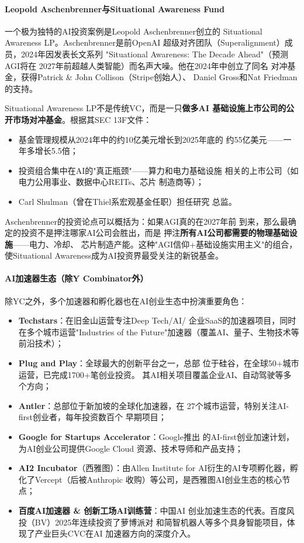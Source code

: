 \paragraph{Leopold Aschenbrenner与Situational Awareness Fund}

一个极为独特的AI投资案例是Leopold Aschenbrenner创立的
Situational Awareness LP。Aschenbrenner是前OpenAI
超级对齐团队（Superalignment）成员，2024年因发表长文系列
"Situational Awareness: The Decade Ahead"（预测AGI将在
2027年前超越人类智能）而名声大噪。他在2024年中创立了同名
对冲基金，获得Patrick \& John Collison（Stripe创始人）、
Daniel Gross和Nat Friedman的支持。

Situational Awareness LP不是传统VC，而是一只\textbf{做多AI
基础设施上市公司的公开市场对冲基金}。根据其SEC 13F文件：
\begin{itemize}
  \item 基金管理规模从2024年中的约10亿美元增长到2025年底的
    约55亿美元——一年多增长5.5倍；
  \item 投资组合集中在AI的"真正瓶颈"——算力和电力基础设施
    相关的上市公司（如电力公用事业、数据中心REITs、芯片
    制造商等）；
  \item Carl Shulman（曾在Thiel系宏观基金任职）担任研究
    总监。
\end{itemize}

Aschenbrenner的投资论点可以概括为：如果AGI真的在2027年前
到来，那么最确定的投资不是押注哪家AI公司会胜出，而是
押注\textbf{所有AI公司都需要的物理基础设施}——电力、冷却、
芯片制造产能。这种"AGI信仰+基础设施实用主义"的组合，
使Situational Awareness成为AI投资界最受关注的新锐基金。

\paragraph{AI加速器生态（除Y Combinator外）}

除YC之外，多个加速器和孵化器也在AI创业生态中扮演重要角色：
\begin{itemize}
  \item \textbf{Techstars}：在旧金山运营专注Deep Tech/AI/
    企业SaaS的加速器项目，同时在多个城市运营"Industries of
    the Future"加速器（覆盖AI、量子、生物技术等前沿技术）；
  \item \textbf{Plug and Play}：全球最大的创新平台之一，总部
    位于硅谷，在全球50+城市运营，已完成1700+笔创业投资。
    其AI相关项目覆盖企业AI、自动驾驶等多个方向；
  \item \textbf{Antler}：总部位于新加坡的全球化加速器，在
    27个城市运营，特别关注AI-first创业者，每年投资数百个
    早期项目；
  \item \textbf{Google for Startups Accelerator}：Google推出
    的AI-first创业加速计划，为AI创业公司提供Google Cloud
    资源、技术导师和产品支持；
  \item \textbf{AI2 Incubator}（西雅图）：由Allen Institute
    for AI衍生的AI专项孵化器，孵化了Vercept（后被Anthropic
    收购）等公司，是西雅图AI创业生态的核心节点；
  \item \textbf{百度AI加速器 \& 创新工场AI训练营}：中国AI
    创业加速生态的代表。百度风投（BV）2025年连续投资了萝博派对
    和简智机器人等多个具身智能项目，体现了产业巨头CVC在AI
    加速器方向的深度介入。
\end{itemize}

